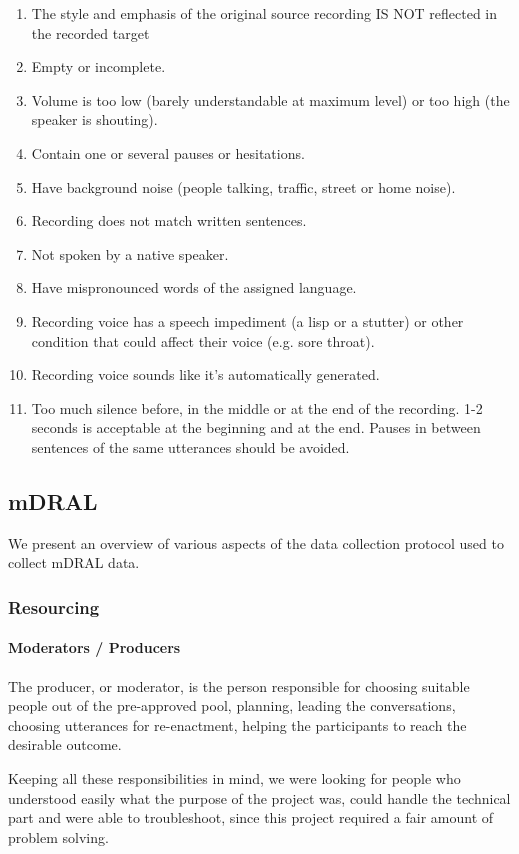 \begin{enumerate}
\item The style and emphasis of the original source recording IS NOT reflected in the recorded target
\item Empty or incomplete.
\item Volume is too low (barely understandable at maximum level) or too high (the speaker is
shouting).
\item Contain one or several pauses or hesitations.
\item Have background noise (people talking, traffic, street or home noise).
\item Recording does not match written sentences.
\item Not spoken by a native speaker.
\item Have mispronounced words of the assigned language.
\item Recording voice has a speech impediment (a lisp or a stutter) or other condition that could affect their voice (e.g. sore throat).
\item Recording voice sounds like it’s automatically generated.
\item Too much silence before, in the middle or at the end of the recording. 1-2 seconds is acceptable at the beginning and at the end. Pauses in between sentences of the same utterances should be avoided.
\end{enumerate}


\subsection{mDRAL}
We present an overview of various aspects of the data collection protocol used to collect mDRAL data.

\subsubsection{Resourcing}

\paragraph{\textbf{Moderators / Producers}}
The producer, or moderator, is the person responsible for choosing suitable people out of the pre-approved pool, planning, leading the conversations, choosing utterances for re-enactment, helping the participants to reach the desirable outcome. 

Keeping all these responsibilities in mind, we were looking for people who understood easily what the purpose of the project was, could handle the technical part and were able to troubleshoot, since this project required a fair amount of problem solving. 

